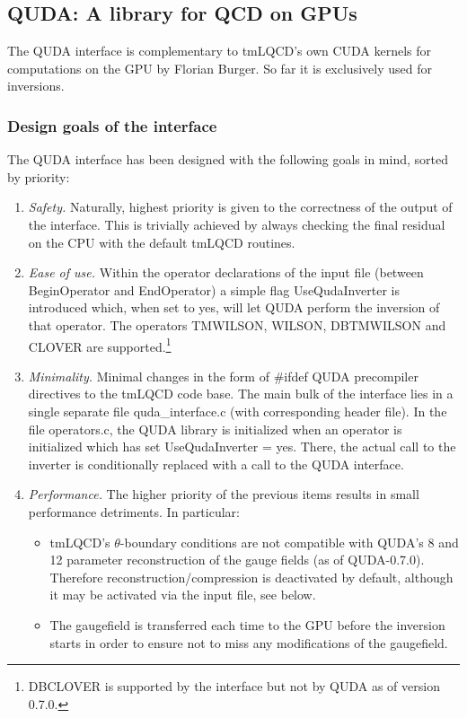 
\subsection{QUDA: A library for QCD on GPUs}\label{subsec:quda}


The QUDA \cite{Clark:2009wm, Babich:2011np, Strelchenko:2013vaa} interface is complementary to tmLQCD's own CUDA kernels for computations on the GPU by Florian Burger.
So far it is exclusively used for inversions.

\subsubsection{Design goals of the interface}
The QUDA interface has been designed with the following goals in mind, sorted by priority:
\begin{enumerate}
	\item \emph{Safety.} Naturally, highest priority is given to the correctness of the output of the interface. 
	This is trivially achieved by always checking the final residual on the CPU with the default tmLQCD routines.
	\item \emph{Ease of use.} Within the operator declarations of the input file (between {\ttfamily BeginOperator} and {\ttfamily EndOperator}) a simple flag {\ttfamily UseQudaInverter} is introduced which, when set to {\ttfamily yes}, will let QUDA perform the inversion of that operator. The operators {\ttfamily TMWILSON, WILSON, DBTMWILSON} and {\ttfamily CLOVER} are supported.\footnote{{\ttfamily DBCLOVER} is supported by the interface but not by QUDA as of version 0.7.0.}
	\item \emph{Minimality.} Minimal changes in the form of {\ttfamily \#ifdef QUDA} precompiler directives to the tmLQCD code base. The main bulk of the interface lies in a single separate file {\ttfamily quda\_interface.c} (with corresponding header file). In the file {\ttfamily operators.c}, the QUDA library is initialized when an operator is initialized which has set {\ttfamily UseQudaInverter = yes}. There, the actual call to the inverter is conditionally replaced with a call to the QUDA interface.
	\item \emph{Performance.} The higher priority of the previous items results in small performance detriments. In particular:
	\begin{itemize}
		\item tmLQCD's $\theta$-boundary conditions are not compatible with QUDA's 8 and 12 parameter reconstruction of the gauge fields (as of QUDA-0.7.0). Therefore reconstruction/compression is deactivated by default, although it may be activated via the input file, see below.
		\item The gaugefield is transferred each time to the GPU before the inversion starts in order to ensure not to miss any modifications of the gaugefield.
	\end{itemize}
\end{enumerate}



